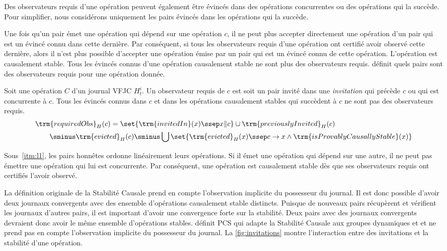 
Des observateurs requis d'une opération peuvent également être évincés dans des opérations concurrentes ou des opérations qui la succède.
Pour simplifier, nous considérons uniquement les pairs évincés dans les opérations qui la succède.


Une fois qu'un pair émet une opération qui dépend sur une opération $c$, il ne peut plus accepter directement une opération d'un pair qui est un évincé connu dans cette dernière.
Par conséquent, si tous les observateurs requis d'une opération ont certifié avoir observé cette dernière, alors il n'est plus possible d'accepter une opération émise par un pair qui est un évincé connu de cette opération.
L'opération est causalement stable.
Tous les évincés connus d'une opération causalement stable ne sont plus des observateurs requis.
 définit quels pairs sont des observateurs requis pour une opération donnée.

\begin{definition}\label{def:required-observer}
Soit une opération $C$ d'un journal \ac{VFJC} $H^i_t$.
Un observateur requis de $c$ est soit un pair invité dans une \emph{invitation} qui précède $c$ ou qui est concurrente à $c$.
Tous les évincés connus dans $c$ et dans les opérations causalement stables qui succèdent à $c$ ne sont pas des observateurs requis.
\begin{align*}
&\trm{requiredObs}_H(c) = \set{\trm{invitedIn}(x) \ssep x \| c} \cup \trm{previouslyInvited}_H(c)\\
&\qquad\sminus \trm{evicted}_H(c) \sminus \bigcup \set{\trm{evicted}_H(x) \ssep c \to x \land \trm{isProvablyCausallyStable}(x)}
\end{align*}
\end{definition}

Sous~\ref{itm:l1}, les pairs honnêtes ordonne linéairement leurs opérations.
Si il émet une opération qui dépend sur une autre, il ne peut pas émettre une opération qui lui est concurrente.
Par conséquent, une opération est causalement stable dès que ses observateurs requis ont certifiés l'avoir observé.

La définition originale de la Stabilité Causale prend en compte l'observation implicite du possesseur du journal.
Il est donc possible d'avoir deux journaux convergents avec des ensemble d'opérations causalement stable distincts.
Puisque de nouveaux pairs récupèrent et vérifient les journaux d'autres pairs, il est important d'avoir une convergence forte sur la stabilité.
Deux pairs avec des journaux convergents devraient donc avoir le même ensemble d'opérations stables.
 définit \acf{PCS} qui adapte la Stabilité Causale aux groupes dynamiques et et ne prend pas en compte l'observation implicite du possesseur du journal.
La \autoref{fig:invitations} montre l'interaction entre des invitations et la stabilité d'une opération.

